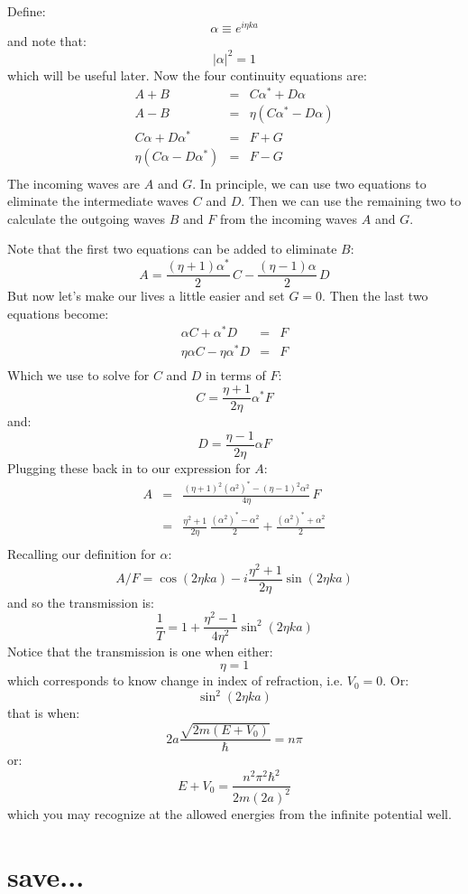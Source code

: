 \documentclass[12pt]{book}
\begin{document}
Define:
$$\alpha \equiv e^{i\eta ka}$$
and note that:
$$|\alpha|^2 = 1$$
which will be useful later.  Now the four continuity equations are:
\begin{eqnarray*}
A + B &=& C \alpha^* + D \alpha \\
A - B &=& \eta(C \alpha^* - D \alpha) \\
C \alpha + D \alpha^* &=& F + G  \\
\eta(C \alpha - D \alpha^*) &=& F - G \\
\end{eqnarray*}
The incoming waves are $A$ and $G$.  In principle, we can use two equations to eliminate the intermediate waves $C$ and $D$.  Then we can use the remaining two to calculate the outgoing waves $B$ and $F$ from the incoming waves $A$ and $G$. 

Note that the first two equations can be added to eliminate $B$:
$$A = \frac{(\eta+1) \alpha^*}{2} \, C - \frac{(\eta-1) \alpha}{2} \, D$$
But now let's make our lives a little easier and set $G=0$.  Then the last two equations become:
\begin{eqnarray*}
\alpha C  + \alpha^* D &=& F   \\
\eta \alpha C  - \eta \alpha^* D &=& F  \\
\end{eqnarray*}
Which we use to solve for $C$ and $D$ in terms of $F$:
$$C = \frac{\eta+1}{2\eta}\alpha^* F$$
and:
$$D = \frac{\eta-1}{2\eta}\alpha F$$
Plugging these back in to our expression for $A$:
\begin{eqnarray*}
A &=& \frac{(\eta+1)^2 (\alpha^2)^* - (\eta-1)^2 \alpha^2}{4 \eta} \, F \\
  &=& \frac{\eta^2+1}{2\eta}\,\frac{(\alpha^2)^*-\alpha^2}{2}+\frac{(\alpha^2)^*+\alpha^2}{2}\\
\end{eqnarray*}
Recalling our definition for $\alpha$:
$$A/F = \cos(2\eta ka) - i\frac{\eta^2+1}{2\eta} \sin(2\eta ka)$$
and so the transmission is:
$$\frac{1}{T} = 1 + \frac{\eta^2-1}{4\eta^2}\sin^2(2\eta ka) $$
Notice that the transmission is one when either:
$$\eta=1$$
which corresponds to know change in index of refraction, i.e. $V_0=0$.  Or:
$$\sin^2(2\eta ka) $$
that is when:
$$ 2a\frac{\sqrt{2m(E+V_0)}}{\hbar}= n \pi$$
or:
$$E+V_0 = \frac{n^2 \pi^2 \hbar^2}{2m (2a)^2}$$
which you may recognize at the allowed energies from the infinite potential well.

\section{save...}
\end{document}
